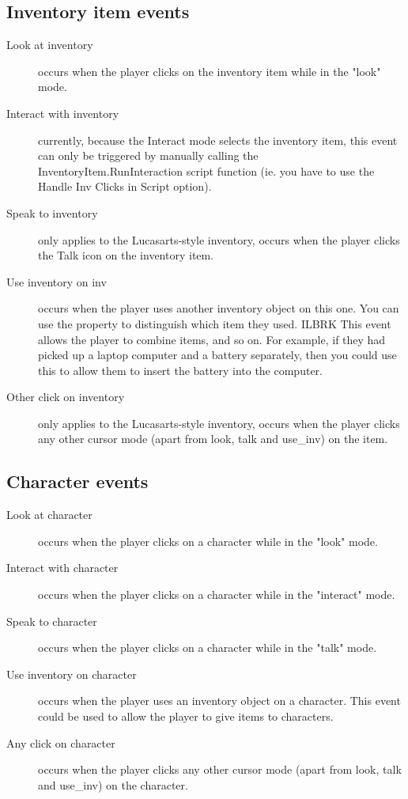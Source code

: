 \subsection{Inventory item events}%

\begin{description}
\item [Look at inventory] occurs when the player clicks on the inventory item
while in the "look" mode.
\item [Interact with inventory] currently, because the Interact mode selects the
inventory item, this event can only be triggered by manually calling
the InventoryItem.RunInteraction script function (ie. you have to use the Handle
Inv Clicks in Script option).
\item [Speak to inventory] only applies to the Lucasarts-style inventory,
occurs when the player clicks the Talk icon on the inventory item.
\item [Use inventory on inv] occurs when the player uses another inventory
object on this one. You can use the 
property to distinguish which item they used. ILBRK
This event allows the player to combine items, and so on. For example, if they had
picked up a laptop computer and a battery separately, then you could use this to
allow them to insert the battery into the computer.
\item [Other click on inventory] only applies to the Lucasarts-style inventory,
occurs when the player clicks any other cursor mode (apart from look, talk
and use_inv) on the item.
\end{description}

\subsection{Character events}%

\begin{description}
\item [Look at character] occurs when the player clicks on a character while in the "look" mode.
\item [Interact with character] occurs when the player clicks on a character while in the "interact" mode.
\item [Speak to character] occurs when the player clicks on a character while in the "talk" mode.
\item [Use inventory on character] occurs when the player uses an inventory
object on a character.  This event could be used to allow the player to give items to characters.
\item [Any click on character] occurs when the player clicks any other cursor mode (apart from look, talk and use_inv) on the character.
\end{description}

